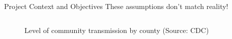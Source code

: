 \begin{slide}{Project Context and Objectives}
	{\large These assumptions don't match reality!}
	\begin{columns}[T]
		\begin{column}{.5\textwidth}
			\begin{figure}
				\centering
				Level of community transmission by county {\tiny (Source: CDC)}\\
				 \\
			\end{figure}
		\end{column}

\end{columns}
\end{slide}

